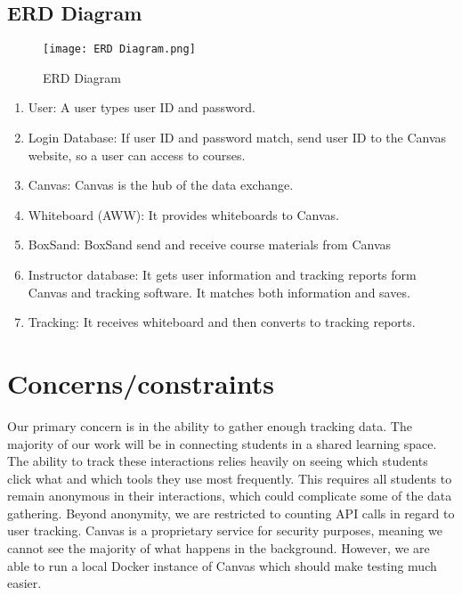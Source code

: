 \documentclass[onecolumn, draftclsnofoot,10pt, compsoc]{IEEEtran}
\begin{document}
	\subsection{ERD Diagram}

		\begin{figure}[H]
			\begin{center}
				\caption{ERD Diagram}
				\texttt{[image: ERD Diagram.png]}
			\end{center}
		\end{figure}

		\begin{enumerate}
			\item
			User: A user types user ID and password.
			\item
			Login Database: If user ID and password match, send user ID to the Canvas website, so a user can access to courses.
			\item
			Canvas: Canvas is the hub of the data exchange.
			\item
			Whiteboard (AWW): It provides whiteboards to Canvas.
			\item
			BoxSand: BoxSand send and receive course materials from Canvas
			\item
			Instructor database: It gets user information and tracking reports form Canvas and tracking software. It matches both information and saves.
			\item
			Tracking: It receives whiteboard and then converts to tracking reports.
		\end{enumerate}


\section{Concerns/constraints}

	Our primary concern is in the ability to gather enough tracking data. The majority of our work will be in connecting students in a shared learning space. The ability to track these interactions relies heavily on seeing which students click what and which tools they use most frequently. This requires all students to remain anonymous in their interactions, which could complicate some of the data gathering. Beyond anonymity, we are restricted to counting API calls in regard to user tracking. Canvas is a proprietary service for security purposes, meaning we cannot see the majority of what happens in the background. However, we are able to run a local Docker instance of Canvas which should make testing much easier.
\end{document}

